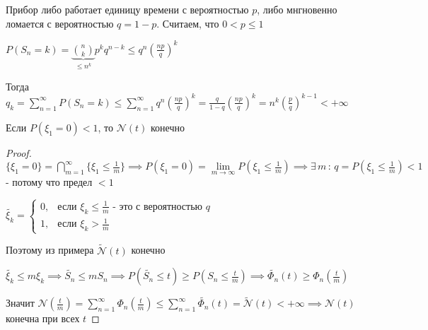 \begin{example}
    Прибор либо работает единицу времени с вероятностью $p$, либо мнгновенно ломается с вероятностью $q = 1 - p$. Считаем, что $0 < p \leqslant 1$

    $P(S_n = k) = \underbrace{\binom{n}{k}}_{\leqslant n^k} p^k q^{n - k} \leqslant q^n \left( \frac{np}{q} \right)^k$

    Тогда $q_k = \sum\limits_{n = 1}^\infty P(S_n = k) \leqslant \sum\limits_{n=1}^\infty q^n \left( \frac{np}{q} \right)^k = \frac{q}{1 - q} \left( \frac{np}{q} \right)^k = n^k \left(\frac{p}{q}\right)^{k - 1} < +\infty$
\end{example}

\begin{theorem}
    Если $P(\xi_1 = 0) < 1$, то $\mathcal{N} (t)$ конечно
\end{theorem}

\begin{proof}
    $\{ \xi_1 = 0 \} = \bigcap\limits_{m=1}^\infty \{ \xi_1 \leqslant \frac{1}{m} \} \implies P(\xi_1 = 0) = \lim\limits_{m \to \infty} P(\xi_1 \leqslant \frac{1}{m}) \implies \exists \, m \, : \, q = P(\xi_1 \leqslant \frac{1}{m}) < 1$ - потому что предел $< 1$

    $\tilde{\xi_k} = 
    \begin{cases}
        0, & \text{если $\xi_k \leqslant \frac{1}{m}$ - это с вероятностью $q$} \\
        1, & \text{если $\xi_k > \frac{1}{m}$}    
    \end{cases}$

    Поэтому из примера $\tilde{\mathcal{N}} (t)$ конечно

    $\tilde{\xi_k} \leqslant m \xi_k \implies \tilde{S_n} \leqslant mS_n \implies P(\tilde{S_n} \leqslant t) \geqslant P(S_n \leqslant \frac{t}{m}) \implies \tilde{\Phi_n} (t) \geqslant \Phi_n \left(\frac{t}{m}\right) $

    Значит $\mathcal{N} \left( \frac{t}{m} \right) = \sum\limits_{n=1}^\infty \Phi_n \left( \frac{t}{m} \right) \leqslant \sum\limits_{n=1}^\infty \tilde{\Phi_n} (t) = \tilde{\mathcal{N}} (t) < +\infty \implies \mathcal{N} (t)$ конечна при всех $t$
\end{proof}

